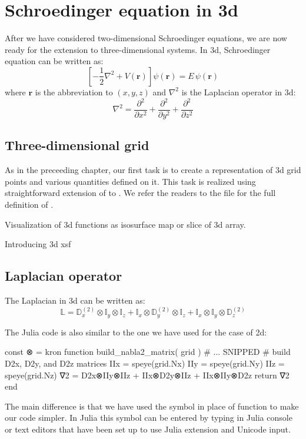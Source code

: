 \chapter{Schroedinger equation in 3d}
\label{chap:sch_3d}

After we have considered two-dimensional Schroedinger equations, we are now ready for
the extension to three-dimensional systems. In 3d, Schroedinger equation can be
written as:
\begin{equation}
\left[ -\frac{1}{2}\nabla^2 + V(\mathbf{r}) \right] \psi(\mathbf{r}) = E\,\psi(\mathbf{r})
\end{equation}
where $\mathbf{r}$ is the abbreviation to $(x,y,z)$ and
%
$\nabla^2$ is the Laplacian operator in 3d:
\begin{equation}
\nabla^2 = \frac{\partial^2}{\partial x^2} + \frac{\partial^2}{\partial y^2} +
\frac{\partial^2}{\partial z^2}
\end{equation}

\section{Three-dimensional grid}

As in the preceeding chapter, our first task is to create a representation of 3d grid
points and various quantities defined on it. This task is realized using straightforward
extension of  to .
We refer the readers to the file  for the full definition of
.

Visualization of 3d functions as isosurface map or slice of 3d array.

Introducing 3d xsf

\section{Laplacian operator}

The Laplacian in 3d can be written as:
\begin{equation}
\mathbb{L} = \mathbb{D}^{(2)}_{x} \otimes \mathbb{I}_{y} \otimes \mathbb{I}_{z} +
\mathbb{I}_{x} \otimes \mathbb{D}^{(2)}_{y} \otimes \mathbb{I}_{z} +
\mathbb{I}_{x} \otimes \mathbb{I}_{y} \otimes \mathbb{D}^{(2)}_{z}
\end{equation}

The Julia code is also similar to the one we have used for the case of 2d:
%
\begin{juliacode}
const ⊗ = kron
function build_nabla2_matrix( grid )
  # ... SNIPPED
  # build D2x, D2y, and D2z matrices
  IIx = speye(grid.Nx)
  IIy = speye(grid.Ny)
  IIz = speye(grid.Nz)    
  ∇2 = D2x⊗IIy⊗IIz + IIx⊗D2y⊗IIz + IIx⊗IIy⊗D2z
  return ∇2
end
\end{juliacode}
%
The main difference is that we have used the symbol  in place
of  function to make our code simpler. In Julia this symbol
can be entered by typing \txtinline{\otimes} in Julia console or text editors
that have been set up to use Julia extension and Unicode input.



